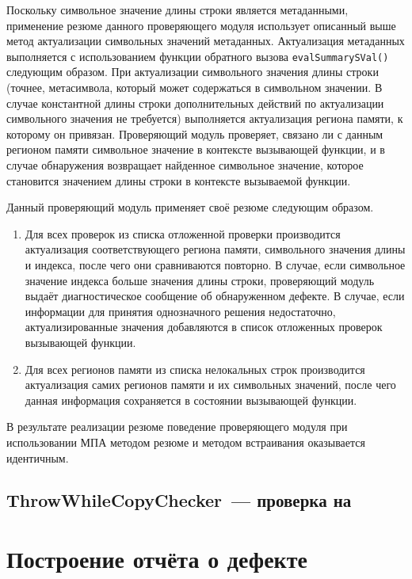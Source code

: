 Поскольку символьное значение длины строки является метаданными, применение резюме данного проверяющего модуля использует описанный выше метод актуализации символьных значений метаданных. Актуализация метаданных выполняется с использованием функции обратного вызова \texttt{evalSummarySVal()} следующим образом. При актуализации символьного значения длины строки (точнее, метасимвола, который может содержаться в символьном значении. В случае константной длины строки дополнительных действий по актуализации символьного значения не требуется) выполняется актуализация региона памяти, к которому он привязан. Проверяющий модуль проверяет, связано ли с данным регионом памяти символьное значение в контексте вызывающей функции, и в случае обнаружения возвращает найденное символьное значение, которое становится значением длины строки в контексте вызываемой функции.


Данный проверяющий модуль применяет своё резюме следующим образом.

\begin{enumerate}
 \item Для всех проверок из списка отложенной проверки производится актуализация соответствующего региона памяти, символьного значения длины и индекса, после чего они сравниваются повторно. В случае, если символьное значение индекса больше значения длины строки, проверяющий модуль выдаёт диагностическое сообщение об обнаруженном дефекте. В случае, если информации для принятия однозначного решения недостаточно, актуализированные значения добавляются в список отложенных проверок вызывающей функции.
 \item Для всех регионов памяти из списка нелокальных строк производится актуализация самих регионов памяти и их символьных значений, после чего данная информация сохраняется в состоянии вызывающей функции.
\end{enumerate}

В результате реализации резюме поведение проверяющего модуля при использовании МПА методом резюме и методом встраивания оказывается идентичным.

\subsection{ThrowWhileCopyChecker~--- проверка на }


\section{Построение отчёта о дефекте}

